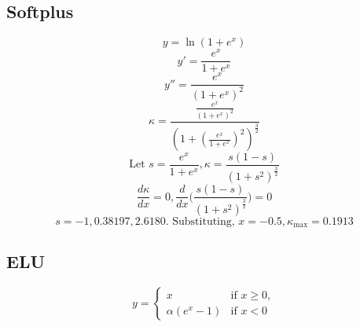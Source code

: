 \documentclass{article}
\begin{document}
\subsection{Softplus}\label{app:softplus}

\begin{displaymath}
  y = \ln{({1 + e^{x}})}
\end{displaymath}
\begin{displaymath}
  y' = \frac{e^x}{1 + e^x}
\end{displaymath}
\begin{displaymath}
  y'' = \frac{e^{x}}{(1 + e^{x})^2}
\end{displaymath}
\begin{displaymath}
  \kappa = \frac{\frac{e^{x}}{(1 + e^{x})^2}}{(1 + (\frac{e^x}{1 + e^x})^2)^\frac{3}{2}}
\end{displaymath}
\begin{displaymath}
  \text{Let }s = \frac{e^x}{1 + e^x}, \kappa = \frac{s(1 - s)}{(1 + s^2)^\frac{3}{2}}
\end{displaymath}
\begin{displaymath}
  \frac{d\kappa}{dx} = 0, \frac{d}{dx}\bigg(\frac{s(1 - s)}{(1 + s^2)^\frac{3}{2}}\bigg) = 0
\end{displaymath}
\begin{displaymath}
  s = -1, 0.38197, 2.6180 \text{. Substituting, }x = -0.5, \kappa_{\text{max}} = 0.1913
\end{displaymath}

\subsection{ELU}\label{app:elu}
 \begin{displaymath}
  y = \begin{cases}
  x & \text{if } x \geq 0, \\
  \alpha (e^x - 1) & \text{if } x < 0
\end{cases}
 \end{displaymath}
\end{document}

